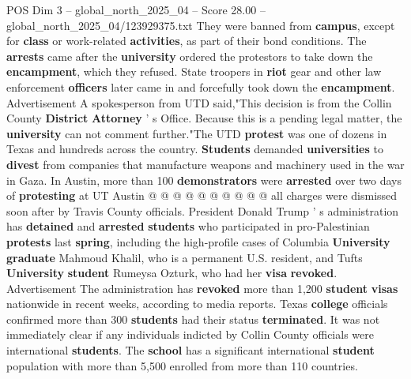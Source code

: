 \begin{textsample}{POS Dim 3 – global\_north\_2025\_04 – Score 28.00 – global\_north\_2025\_04/123929375.txt}
They were banned from \textbf{campus}, except for \textbf{class} or work-related \textbf{activities}, as part of their bond conditions.
The \textbf{arrests} came after the \textbf{university} ordered the protestors to take down the \textbf{encampment}, which they refused.
State troopers in \textbf{riot} gear and other law enforcement \textbf{officers} later came in and forcefully took down the \textbf{encampment}.
Advertisement A spokesperson from UTD said,"This decision is from the Collin County \textbf{District} \textbf{Attorney} ' s Office.
Because this is a pending legal matter, the \textbf{university} can not comment further."The UTD \textbf{protest} was one of dozens in Texas and hundreds across the country. \textbf{Students} demanded \textbf{universities} to \textbf{divest} from companies that manufacture weapons and machinery used in the war in Gaza.
In Austin, more than 100 \textbf{demonstrators} were \textbf{arrested} over two days of \textbf{protesting} at UT Austin @ @ @ @ @ @ @ @ @ @ all charges were dismissed soon after by Travis County officials.
President Donald Trump ' s administration has \textbf{detained} and \textbf{arrested} \textbf{students} who participated in pro-Palestinian \textbf{protests} last \textbf{spring}, including the high-profile cases of Columbia \textbf{University} \textbf{graduate} Mahmoud Khalil, who is a permanent U.S. resident, and Tufts \textbf{University} \textbf{student} Rumeysa Ozturk, who had her \textbf{visa} \textbf{revoked}.
Advertisement The administration has \textbf{revoked} more than 1,200 \textbf{student} \textbf{visas} nationwide in recent weeks, according to media reports.
Texas \textbf{college} officials confirmed more than 300 \textbf{students} had their status \textbf{terminated}.
It was not immediately clear if any individuals indicted by Collin County officials were international \textbf{students}.
The \textbf{school} has a significant international \textbf{student} population with more than 5,500 enrolled from more than 110 countries.

\end{textsample}

